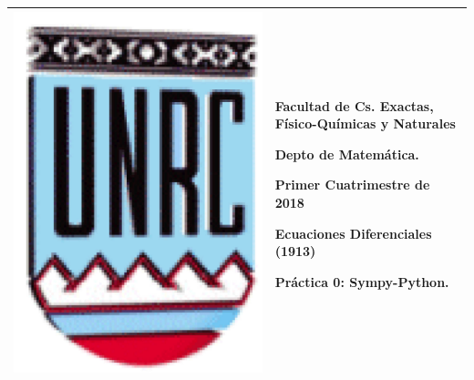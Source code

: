\documentclass{article}
\begin{document}
\setlength{\unitlength}{1cm}
%
\setlength{\extrarowheight}{5mm}
%

\noindent\begin{tabular}{m{} m{}}\hline\hline
\includegraphics[scale=.4]{unrc.jpg} &
\begin{bfseries}  \begin{scshape}
Facultad de Cs. Exactas, F\'isico-Qu\'imicas y Naturales\par
        Depto de Matem\'atica.\par
        Primer Cuatrimestre de 2018\par
        Ecuaciones Diferenciales (1913) \par
        Pr\'actica 0: Sympy-Python.

\end{scshape}
\end{bfseries}
\\
\hline\hline
\end{tabular}
\renewcommand{\theenumi}{\alph{enumi}}
\end{document}
